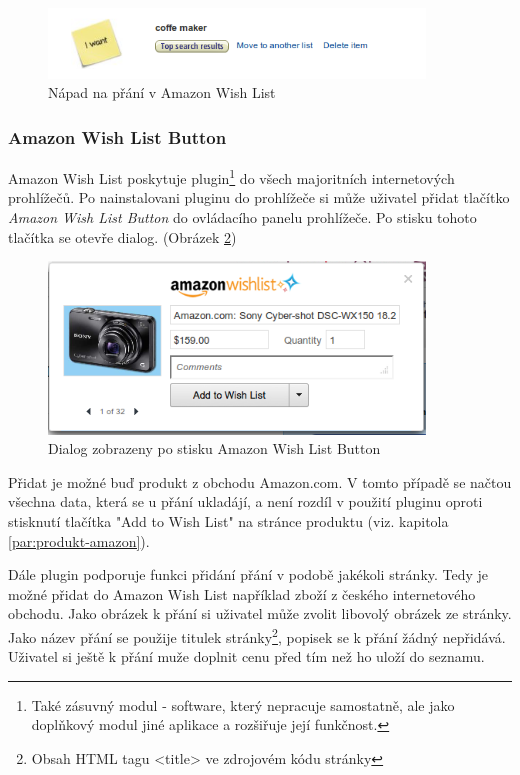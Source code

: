 \begin{figure}[htb]
\begin{center}
\includegraphics[width=100mm]{./pictures/amazon-wishlist-idea.png}
\caption{Nápad na přání v Amazon Wish List}
\label{fig:amazon-wishlist-idea}
\end{center}
\end{figure}

\subsubsection{Amazon Wish List Button}
\label{sec:amazon-wishlist-button}
Amazon Wish List poskytuje plugin\footnote{Také zásuvný modul - software, který nepracuje samostatně, ale jako doplňkový modul jiné aplikace a rozšiřuje její funkčnost.} do všech majoritních internetových prohlížečů\cite{website:amazon:plugin}. Po nainstalovani pluginu do prohlížeče si může uživatel přidat tlačítko \emph{Amazon Wish List Button} do ovládacího panelu prohlížeče. Po stisku tohoto tlačítka se otevře dialog. (Obrázek \ref{fig:amazon-wishlist-plugin})

\begin{figure}[htb]
\begin{center}
\includegraphics[width=100mm]{./pictures/amazon-wishlist-plugin.png}
\caption{Dialog zobrazeny po stisku Amazon Wish List Button}
\label{fig:amazon-wishlist-plugin}
\end{center}
\end{figure}

Přidat je možné buď produkt z obchodu Amazon.com. V tomto případě se načtou všechna data, která se u přání ukladájí, a není rozdíl v použití pluginu oproti stisknutí tlačítka "Add to Wish List" na stránce produktu (viz. kapitola \ref{par:produkt-amazon}).

Dále plugin podporuje funkci přidání přání v podobě jakékoli stránky. Tedy je možné přidat do Amazon Wish List například zboží z českého internetového obchodu. Jako obrázek k přání si uživatel může zvolit libovolý obrázek ze stránky. Jako název přání se použije titulek stránky\footnote{Obsah HTML tagu <title> ve zdrojovém kódu stránky}, popisek se k přání žádný nepřidává. Uživatel si ještě k přání muže doplnit cenu před tím než ho uloží do seznamu.

